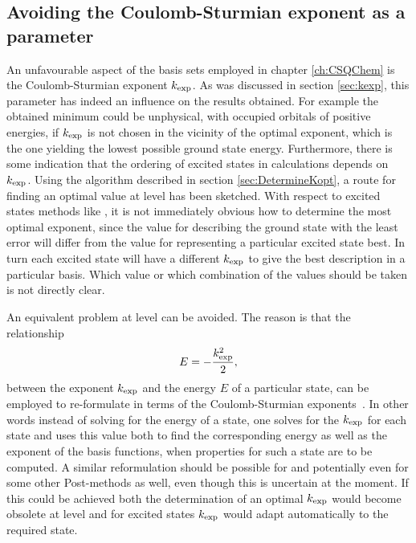 \subsection{Avoiding the Coulomb-Sturmian exponent as a parameter}
An unfavourable aspect of the \CS basis sets
employed in chapter \ref{ch:CSQChem} is
the Coulomb-Sturmian exponent $k_\text{exp}$.
As was discussed in section \ref{sec:kexp},
this parameter has indeed an influence on the results obtained.
For example the obtained \SCF minimum could be unphysical,
\ie with occupied orbitals of positive energies,
if $k_\text{exp}$ is not chosen in the vicinity of the optimal exponent,
which is the one yielding the lowest possible \HF ground state energy.
Furthermore, there is some indication
that the ordering of excited states in \ADC calculations depends on $k_\text{exp}$.
Using the algorithm described in section \ref{sec:DetermineKopt},
a route for finding an optimal value at \HF level has been sketched.
With respect to excited states methods like \ADC,
it is not immediately obvious how to determine the most optimal exponent,
since the value for describing the ground state with the least error
will differ from the value for representing a particular excited state best.
In turn each excited state will have a different $k_\text{exp}$
to give the best description in a particular \CS basis.
Which value or which combination of the values should be taken
is not directly clear.

\noindent
An equivalent problem at \FCI level can be avoided.
The reason is that the relationship
\[ E = - \frac{k_\text{exp}^2}{2}, \]
between the \CS exponent $k_\text{exp}$ and the energy $E$ of a particular state,
can be employed to re-formulate \FCI in terms of the
Coulomb-Sturmian exponents~\cite{Avery2006}.
In other words instead of solving for the energy of a state,
one solves for the $k_\text{exp}$ for each state
and uses this value both to find the corresponding energy
as well as the exponent of the basis functions,
when properties for such a state are to be computed.
A similar reformulation should be possible for \HF
and potentially even for some other Post-\HF methods as well,
even though this is uncertain at the moment.
If this could be achieved both the determination of an optimal
$k_\text{exp}$ would become obsolete at \HF level
and for excited states $k_\text{exp}$ would adapt automatically to the required state.

